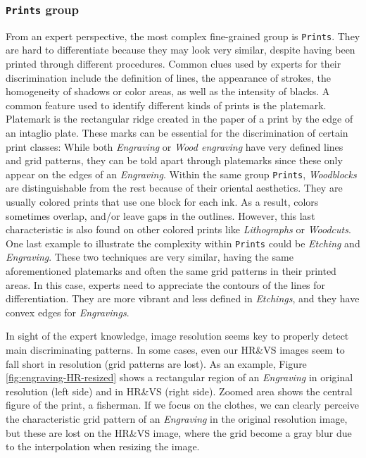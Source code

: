 \documentclass{article}
\begin{document}
\subsubsection{\texttt{Prints} group} \label{sec:prints-group}

From an expert perspective, the most complex fine-grained group is \texttt{Prints}. They are hard to differentiate because they may look very similar, despite having been printed through different procedures. Common clues used by experts for their discrimination include the definition of lines, the appearance of strokes, the homogeneity of shadows or color areas, as well as the intensity of blacks. A common feature used to identify different kinds of prints is the platemark. Platemark is the rectangular ridge created in the paper of a print by the edge of an intaglio plate. These marks can be essential for the discrimination of certain print classes: While both \textit{Engraving} or \textit{Wood engraving} have very defined lines and grid patterns, they can be told apart through platemarks since these only appear on the edges of an \textit{Engraving}. Within the same group \texttt{Prints}, \textit{Woodblocks} are distinguishable from the rest because of their oriental aesthetics. They are usually colored prints that use one block for each ink. As a result, colors sometimes overlap, and/or leave gaps in the outlines. However, this last characteristic is also found on other colored prints like \textit{Lithographs} or \textit{Woodcuts}. One last example to illustrate the complexity within \texttt{Prints} could be \textit{Etching} and \textit{Engraving}. These two techniques are very similar, having the same aforementioned platemarks and often the same grid patterns in their printed areas. In this case, experts need to appreciate the contours of the lines for differentiation. They are more vibrant and less defined in \textit{Etchings}, and they have convex edges for \textit{Engravings}.

In sight of the expert knowledge, image resolution seems key to properly detect main discriminating patterns. In some cases, even our HR\&VS images seem to fall short in resolution (\eg grid patterns are lost). As an example, Figure \ref{fig:engraving-HR-resized} shows a rectangular region of an \textit{Engraving} in original resolution (left side) and in HR\&VS (right side). Zoomed area shows the central figure of the print, a fisherman. If we focus on the clothes, we can clearly perceive the characteristic grid pattern of an \textit{Engraving} in the original resolution image, but these are lost on the HR\&VS image, where the grid become a gray blur due to the interpolation when resizing the image.
\end{document}
